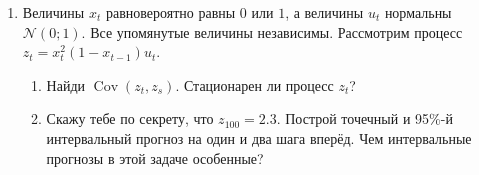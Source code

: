 \documentclass[12pt]{article}
\DeclareMathOperator{\Cov}{Cov}
\def \cN{\mathcal{N}}
\begin{document}
\begin{enumerate}[resume]
\item Величины $x_t$ равновероятно равны $0$ или $1$, 
а величины $u_t$ нормальны $\cN(0; 1)$. Все упомянутые величины независимы.
Рассмотрим процесс $z_t = x_t^2 (1-x_{t-1}) u_t$.

\begin{enumerate}
	\item Найди $\Cov(z_t, z_s)$. Стационарен ли процесс $z_t$?
	\item Скажу тебе по секрету, что $z_{100} = 2.3$. 
	Построй точечный и 95\%-й интервальный прогноз на один и два шага вперёд. 
	Чем интервальные прогнозы в этой задаче особенные?
\end{enumerate}


\end{enumerate}
\end{document}

